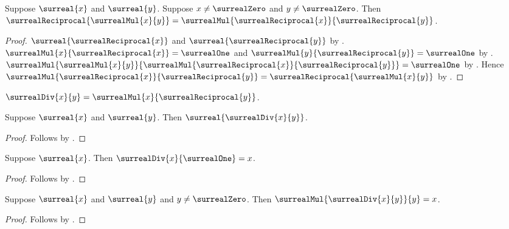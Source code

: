 \begin{theorem}\label{surreal_reciprocal_multiplicative}
    Suppose $\surreal{x}$ and $\surreal{y}$.
    Suppose $x\neq\surrealZero$ and $y\neq\surrealZero$.
    Then
        $\surrealReciprocal{\surrealMul{x}{y}}
        =\surrealMul{\surrealReciprocal{x}}{
            \surrealReciprocal{y}}$.
\end{theorem}
\begin{proof}
    $\surreal{\surrealReciprocal{x}}$ and
        $\surreal{\surrealReciprocal{y}}$
        by .
    $\surrealMul{x}{\surrealReciprocal{x}}=\surrealOne$ and
        $\surrealMul{y}{\surrealReciprocal{y}}=\surrealOne$
        by .
    $\surrealMul{\surrealMul{x}{y}}{
        \surrealMul{\surrealReciprocal{x}}{
            \surrealReciprocal{y}}}=\surrealOne$
        by .
    Hence $\surrealMul{\surrealReciprocal{x}}{
        \surrealReciprocal{y}}
        =\surrealReciprocal{\surrealMul{x}{y}}$
        by .
\end{proof}

\begin{definition}\label{surreal_division}
    $\surrealDiv{x}{y}=\surrealMul{x}{\surrealReciprocal{y}}$.
\end{definition}

\begin{theorem}\label{surreal_division_is_surreal}
    Suppose $\surreal{x}$ and $\surreal{y}$.
    Then $\surreal{\surrealDiv{x}{y}}$.
\end{theorem}
\begin{proof}
    Follows by
        .
\end{proof}

\begin{proposition}\label{surreal_division_one}
    Suppose $\surreal{x}$.
    Then $\surrealDiv{x}{\surrealOne}=x$.
\end{proposition}
\begin{proof}
    Follows by
        .
\end{proof}

\begin{theorem}\label{surreal_division_cancel_right}
    Suppose $\surreal{x}$ and $\surreal{y}$ and
        $y\neq\surrealZero$.
    Then $\surrealMul{\surrealDiv{x}{y}}{y}=x$.
\end{theorem}
\begin{proof}
    Follows by
        .
\end{proof}

